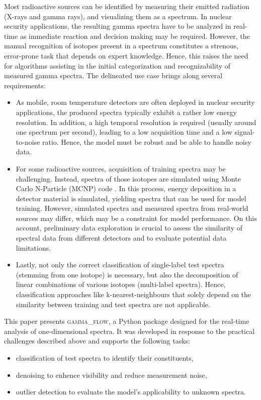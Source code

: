 \documentclass[preprint, 12pt, a4paper]{elsarticle}
\begin{document}
Most radioactive sources can be identified by measuring their emitted radiation (X-rays and gamma rays), and visualizing them as a spectrum. In nuclear security applications, the resulting gamma spectra have to be analyzed in real-time as immediate reaction and decision making may be required. 
However, the manual recognition of isotopes present in a spectrum constitutes a 
strenous, error-prone task that depends on expert knowledge. Hence, this raises 
the need for algorithms assisting in the initial categorization and recognizability 
of measured gamma spectra. 
The delineated use case brings along several requirements:  
\begin{itemize}
\item As mobile, room temperature detectors are often deployed in nuclear security applications, the produced spectra typically exhibit a rather low energy resolution. In addition, a high temporal resolution is required (usually around one spectrum per second), leading to a low acquisition time and a low signal-to-noise ratio. Hence, the model must be robust and be able to handle noisy data.  
\item For some radioactive sources, acquisition of training spectra may be challenging. Instead, spectra of those isotopes are simulated using Monte Carlo N-Particle (MCNP) code \cite{Kulesza2022}. In this process, energy deposition in a detector material is simulated, yielding spectra that can be used for model training. However, simulated spectra and measured spectra from real-world sources may differ, which may be a constraint for model performance. On this account, preliminary data exploration is crucial to assess the similarity of spectral data from different detectors and to evaluate potential data limitations.  
\item Lastly, not only the correct classification of single-label test spectra (stemming from one isotope) is necessary, but also the decomposition of linear combinations of various isotopes (multi-label spectra). Hence, classification approaches like k-nearest-neighbours that solely depend on the similarity between training and test spectra are not applicable.  
\end{itemize} 
This paper presents \textsc{gamma\_flow}, a Python package designed for the real-time analysis of one-dimensional spectra. It was developed in response to the practical challenges described above and supports the following tasks:
\begin{itemize}
\item classification of test spectra to identify their constituents,  
\item denoising to enhence visibility and reduce measurement noise,
\item outlier detection to evaluate the model's applicability to unknown spectra.   
\end{itemize}
\end{document}

